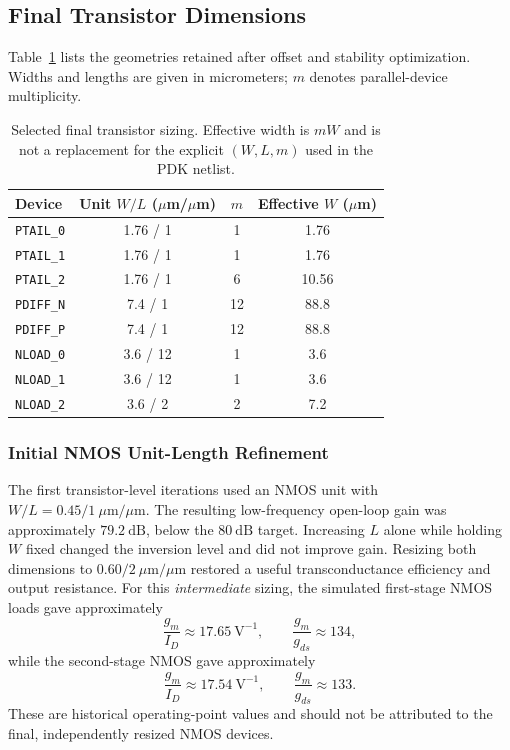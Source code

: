 \subsection{Final Transistor Dimensions}

Table~\ref{tab:final_transistor_sizing} lists the geometries retained
after offset and stability optimization. Widths and lengths are given
in micrometers; $m$ denotes parallel-device multiplicity.

\begin{table}[ht]
    \centering
    \caption{Selected final transistor sizing. Effective width is
    $mW$ and is not a replacement for the explicit $(W,L,m)$ used in
    the PDK netlist.}
    \label{tab:final_transistor_sizing}
    \begin{tabular}{lccc}
        \hline
        Device & Unit $W/L$ ($\mu$m/$\mu$m) & $m$ & Effective $W$ ($\mu$m) \\
        \hline
        \texttt{PTAIL\_0} & 1.76 / 1 & 1 & 1.76 \\
        \texttt{PTAIL\_1} & 1.76 / 1 & 1 & 1.76 \\
        \texttt{PTAIL\_2} & 1.76 / 1 & 6 & 10.56 \\
        \texttt{PDIFF\_N} & 7.4 / 1 & 12 & 88.8 \\
        \texttt{PDIFF\_P} & 7.4 / 1 & 12 & 88.8 \\
        \texttt{NLOAD\_0} & 3.6 / 12 & 1 & 3.6 \\
        \texttt{NLOAD\_1} & 3.6 / 12 & 1 & 3.6 \\
        \texttt{NLOAD\_2} & 3.6 / 2 & 2 & 7.2 \\
        \hline
    \end{tabular}
\end{table}

\subsubsection{Initial NMOS Unit-Length Refinement}

The first transistor-level iterations used an NMOS unit with
$W/L=0.45/1~\mu\mathrm{m}/\mu\mathrm{m}$. The resulting low-frequency
open-loop gain was approximately $79.2~\mathrm{dB}$, below the
$80~\mathrm{dB}$ target. Increasing $L$ alone while holding $W$
fixed changed the inversion level and did not improve gain.
Resizing both dimensions to $0.60/2~\mu\mathrm{m}/\mu\mathrm{m}$
restored a useful transconductance efficiency and output resistance.
For this \emph{intermediate} sizing, the simulated first-stage NMOS
loads gave approximately
\[
\frac{g_m}{I_D}\approx17.65~\mathrm{V}^{-1},\qquad
\frac{g_m}{g_{ds}}\approx134,
\]
while the second-stage NMOS gave approximately
\[
\frac{g_m}{I_D}\approx17.54~\mathrm{V}^{-1},\qquad
\frac{g_m}{g_{ds}}\approx133.
\]
These are historical operating-point values and should not be
attributed to the final, independently resized NMOS devices.

